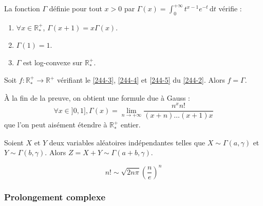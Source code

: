 
  \begin{lemma}
    \label{244-2}
    La fonction $\Gamma$ définie pour tout $x > 0$ par $\Gamma(x) = \int_0^{+\infty} t^{x-1} e^{-t} \, \mathrm{d}t$ vérifie :
    \begin{enumerate}[label={\bfseries(\roman*)}]
      \item \label{244-3} $\forall x \in \mathbb{R}^+_*$, $\Gamma(x+1) = x\Gamma(x)$.
      \item \label{244-4} $\Gamma(1) = 1$.
      \item \label{244-5} $\Gamma$ est log-convexe sur $\mathbb{R}^+_*$.
    \end{enumerate}
  \end{lemma}


  \begin{theorem}
    Soit $f : \mathbb{R}^+_* \rightarrow \mathbb{R}^+$ vérifiant le \cref{244-3}, \cref{244-4} et \cref{244-5} du \cref{244-2}. Alors $f = \Gamma$.
  \end{theorem}

  \begin{remark}
    À la fin de la preuve, on obtient une formule due à Gauss :
    \[ \forall x \in ]0, 1], \Gamma(x) = \lim_{n \rightarrow +\infty} \frac{n^x n!}{(x+n) \dots (x+1)x} \]
    que l'on peut aisément étendre à $\mathbb{R}^+_*$ entier.
  \end{remark}


  \begin{lemma}
    Soient $X$ et $Y$ deux variables aléatoires indépendantes telles que $X \sim \Gamma(a, \gamma)$ et $Y \sim \Gamma(b, \gamma)$. Alors $Z = X + Y \sim \Gamma(a+b, \gamma)$.
  \end{lemma}


  \begin{application}
    \[ n! \sim \sqrt{2n\pi} \left(\frac{n}{e} \right)^n \]
  \end{application}

  \subsubsection{Prolongement complexe}


